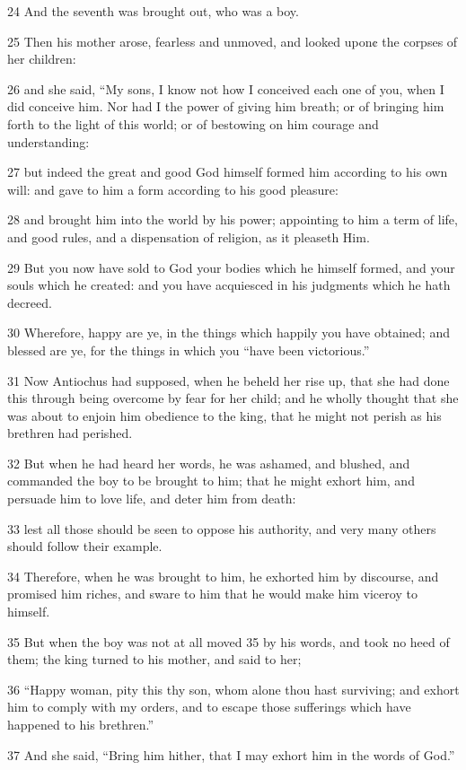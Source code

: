 24 And the seventh was brought out, who was a boy. 

25 Then his mother arose, fearless and unmoved, and looked upon¢ the corpses of her children: 

26 and she said, “My sons, I know not how I conceived each one of you, when I did conceive him. Nor had I the power of giving him breath; or of bringing him forth to the light of this world; or of bestowing on him courage and understanding: 

27 but indeed the great and good God himself formed him according to his own will: and gave to him a form according to his good pleasure: 

28 and brought him into the world by his power; appointing to him a term of life, and good rules, and a dispensation of religion, as it pleaseth Him. 

29 But you now have sold to God your bodies which he himself formed, and your souls which he created: and you have acquiesced in his judgments which he hath decreed. 

30 Wherefore, happy are ye, in the things which happily you have obtained; and blessed are ye, for the things in which you “have been victorious.” 

31 Now Antiochus had supposed, when he beheld her rise up, that she had done this through being overcome by fear for her child; and he wholly thought that she was about to enjoin him obedience to the king, that he might not perish as his brethren had perished. 

32 But when he had heard her words, he was ashamed, and blushed, and commanded the boy to be brought to him; that he might exhort him, and persuade him to love life, and deter him from death: 

33 lest all those should be seen to oppose his authority, and very many others should follow their example. 

34 Therefore, when he was brought to him, he exhorted him by discourse, and promised him riches, and sware to him that he would make him viceroy to himself. 

35 But when the boy was not at all moved 35 by his words, and took no heed of them; the king turned to his mother, and said to her; 

36 “Happy woman, pity this thy son, whom alone thou hast surviving; and exhort him to comply with my orders, and to escape those sufferings which have happened to his brethren.” 

37 And she said, “Bring him hither, that I may exhort him in the words of God.” 

